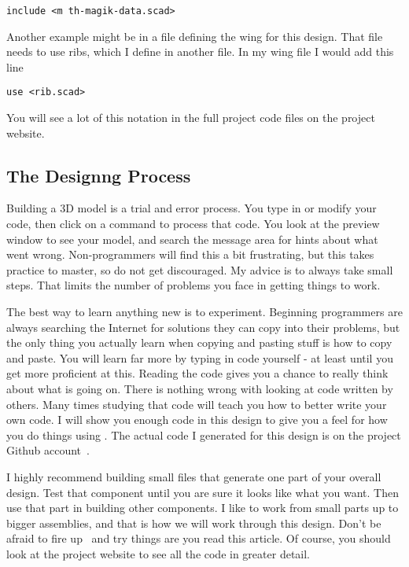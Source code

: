 \begin{lstlisting}
include <m th-magik-data.scad>
\end{lstlisting}

Another example might be in a file defining the wing for this design. That file
needs to use ribs, which I define in another file. In my wing file I would
add this line

\begin{lstlisting}
use <rib.scad>
\end{lstlisting}

You will see a lot of this notation in the full project code files on the
project website.

\subsection*{The Designng Process}

Building a 3D model is a trial and error process. You type in or modify your
code, then click on a command to process that code. You look at the preview
window to see your model, and search the message area for hints about what went
wrong.  Non-programmers will find this a bit frustrating, but this takes
practice to master, so do not get discouraged. My advice is to always take
small steps.  That limits the number of problems you face in getting things to
work.

The best way to learn anything new is to experiment. Beginning programmers are
always searching the Internet for solutions they can copy into their problems,
but the only thing you actually learn when copying and pasting stuff is how to
copy and paste. You will learn far more by typing in code yourself - at least
until you get more proficient at this. Reading the code gives you a chance to
really think about what is going on. There is nothing wrong with looking at
code written by others. Many times studying that code will teach you how to
better write your own code. I will show you enough code in this design to give
you a feel for how you do things using \osc. The actual code I generated for
this design is on the project Github account~\cite{blackr}.

I highly recommend building small files that generate one part of your overall
design. Test that component until you are sure it looks like what you want.
Then use that part in building other components. I like to work from small
parts up to bigger assemblies, and that is how we will work through this
design. Don't be afraid to fire up \osc\ and try things are you read this
article. Of course, you should look at the project website to see all the code
in greater detail.

